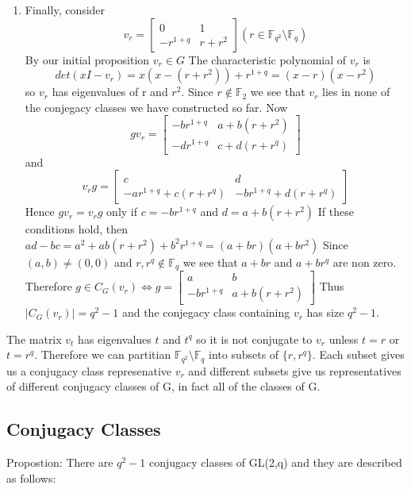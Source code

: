 \documentclass[12pt,twoside]{reedthesis}
\begin{document}
\begin{enumerate}
\item
Finally, consider
$$
v_{r} =
\left[
\begin{matrix}
    0 & 1 \\
    -r^{1+q} & r + r^2
\end{matrix}
\right]
\left(
r \in  \mathbb{F}_{q^2}\setminus \mathbb{F}_q
\right)
$$
By our initial proposition $v_r \in G$
\newline
The characteristic polynomial of 
$v_r$
is
$$
det
(xI - v_r) =
x (x - (r + r^{2}))
+
r^{1 + q}
= (x-r)(x - r^{2})
$$
so $v_{r}$ has eigenvalues of r and $r^{2}$.
\newline
Since $r \notin  \mathbb{F}_{2}$
we see that $v_{r}$ lies in none of the conjegacy classes we have constructed so far.
Now
$$
gv_{r}= 
\left[
\begin{matrix}
-br^{1+q} & a+b(r+r^{2})\\
-dr^{1+q} & c+d(r+r^{q})
\end{matrix}
\right]
$$ 
and
$$
v_{r}g= 
\left[
\begin{matrix}
c  & d\\
-ar^{1+q} +c(r+r^q) & -br^{1+q} + d(r+r^{q})
\end{matrix}
\right]
$$
Hence
$gv_{r} = v_{r}g$ only if $c = -br^{1+q}$ and $d = a+b(r+r^{2})$
If these conditions hold, then 
$ad-bc = a^{2}+ab(r+r^{2}) + b^{2}r^{1+q} = (a+br) (a+br^{2})$
\newline
Since 
$(a,b) \ne (0,0)$ and $r, r^{q} \notin \mathbb{F}_{q}$ 
we see that $a+br$ and $a+br^{q}$ are non zero.
\newline
Therefore $g\in C_{G}(v_{r}) \iff g = 
\left[
\begin{matrix}
 a & b\\
 -br^{1+q} & a+b(r+r^2)
\end{matrix}
\right]$
\newline 
Thus $|C_G(v_r)| = q^2-1$ and the conjegacy class containing $v_r$ has size $q^2-1$.

\end{enumerate}
\newpage

The matrix $v_t$ has eigenvalues $t$ and $t^q$ so it is not conjugate to $v_r$ unless $t=r$ or $t=r^q$.  
Therefore we can partitian $\mathbb{F}_{q^2}\setminus \mathbb{F}_q$ into subsets of $\{r,r^q\}$.
Each subset gives us a conjugacy class represenative $v_r$ and different subsets give us representatives of different conjugacy classes of G, in fact all of the classes of G.

\subsection*{Conjugacy Classes}
Propostion: There are $q^2-1$ conjugacy classes of GL(2,q) and they are described as follows:
\end{document}
